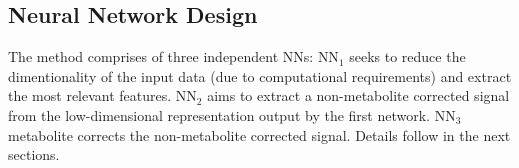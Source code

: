     \subsection{Neural Network Design}\label{sec:NNDesign}
        The method comprises of three independent \glspl{NN}: \gls{NN}$_1$ seeks to reduce the dimentionality of the input data (due to computational requirements) and extract the most relevant features. \gls{NN}$_2$ aims to extract a non-metabolite corrected signal from the low-dimensional representation output by the first network. \gls{NN}$_3$ metabolite corrects the non-metabolite corrected signal. Details follow in the next sections.



